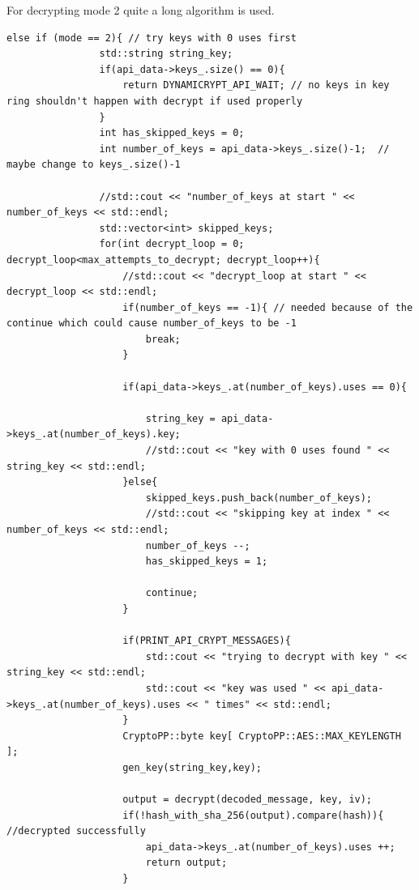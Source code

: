 For decrypting mode 2 quite a long algorithm is used. 
\begin{lstlisting}
else if (mode == 2){ // try keys with 0 uses first
                std::string string_key;
                if(api_data->keys_.size() == 0){
                    return DYNAMICRYPT_API_WAIT; // no keys in key ring shouldn't happen with decrypt if used properly
                }
                int has_skipped_keys = 0;
                int number_of_keys = api_data->keys_.size()-1;  // maybe change to keys_.size()-1
                
                //std::cout << "number_of_keys at start " << number_of_keys << std::endl;
                std::vector<int> skipped_keys;
                for(int decrypt_loop = 0; decrypt_loop<max_attempts_to_decrypt; decrypt_loop++){
                    //std::cout << "decrypt_loop at start " << decrypt_loop << std::endl;
                    if(number_of_keys == -1){ // needed because of the continue which could cause number_of_keys to be -1
                        break;
                    }
                    
                    if(api_data->keys_.at(number_of_keys).uses == 0){
                        
                        string_key = api_data->keys_.at(number_of_keys).key;
                        //std::cout << "key with 0 uses found " << string_key << std::endl;
                    }else{
                        skipped_keys.push_back(number_of_keys);
                        //std::cout << "skipping key at index " << number_of_keys << std::endl;
                        number_of_keys --;
                        has_skipped_keys = 1;
                        
                        continue;
                    }
                    
                    if(PRINT_API_CRYPT_MESSAGES){
                        std::cout << "trying to decrypt with key " << string_key << std::endl;
                        std::cout << "key was used " << api_data->keys_.at(number_of_keys).uses << " times" << std::endl;
                    }
                    CryptoPP::byte key[ CryptoPP::AES::MAX_KEYLENGTH ];
                    gen_key(string_key,key);

                    output = decrypt(decoded_message, key, iv);
                    if(!hash_with_sha_256(output).compare(hash)){ //decrypted successfully
                        api_data->keys_.at(number_of_keys).uses ++;
                        return output;
                    }


\end{lstlisting}
